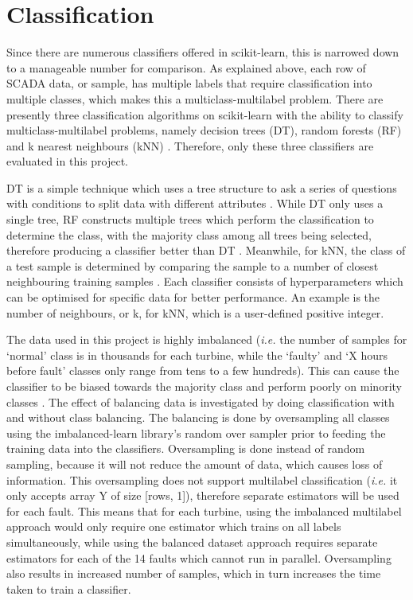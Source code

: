 \section{Classification}

Since there are numerous classifiers offered in scikit-learn, this is narrowed
down to a manageable number for comparison. As explained above, each row of
SCADA data, or sample, has multiple labels that require classification into
multiple classes, which makes this a multiclass-multilabel problem. There are
presently three classification algorithms on scikit-learn with the ability to
classify multiclass-multilabel problems, namely decision trees (DT), random
forests (RF) and k nearest neighbours (kNN) \cite{112}. Therefore, only these
three classifiers are evaluated in this project.

DT is a simple technique which uses a tree structure to ask a series of
questions with conditions to split data with different attributes
\cite{Decis10}. While DT only uses a single tree, RF constructs multiple trees
which perform the classification to determine the class, with the majority
class among all trees being selected, therefore producing a classifier better
than DT \cite{Rando}. Meanwhile, for kNN, the class of a test sample is
determined by comparing the sample to a number of closest neighbouring
training samples \cite{Sutto12,16N}. Each classifier consists of
hyperparameters which can be optimised for specific data for better
performance. An example is the number of neighbours, or k, for kNN, which is a
user-defined positive integer.

The data used in this project is highly imbalanced (\textit{i.e.} the number of samples
for `normal' class is in thousands for each turbine, while the `faulty' and `X
hours before fault' classes only range from tens to a few hundreds). This can
cause the classifier to be biased towards the majority class and perform
poorly on minority classes \cite{110}. The effect of balancing data is
investigated by doing classification with and without class balancing. The
balancing is done by oversampling all classes using the imbalanced-learn
library's random over sampler \cite{Lemai} prior to feeding the training data
into the classifiers. Oversampling is done instead of random sampling, because
it will not reduce the amount of data, which causes loss of information. This
oversampling does not support multilabel classification (\textit{i.e.} it only accepts
array Y of size [rows, 1]), therefore separate estimators will be used for
each fault. This means that for each turbine, using the imbalanced multilabel
approach would only require one estimator which trains on all labels
simultaneously, while using the balanced dataset approach requires separate
estimators for each of the 14 faults which cannot run in parallel.
Oversampling also results in increased number of samples, which in turn
increases the time taken to train a classifier.

